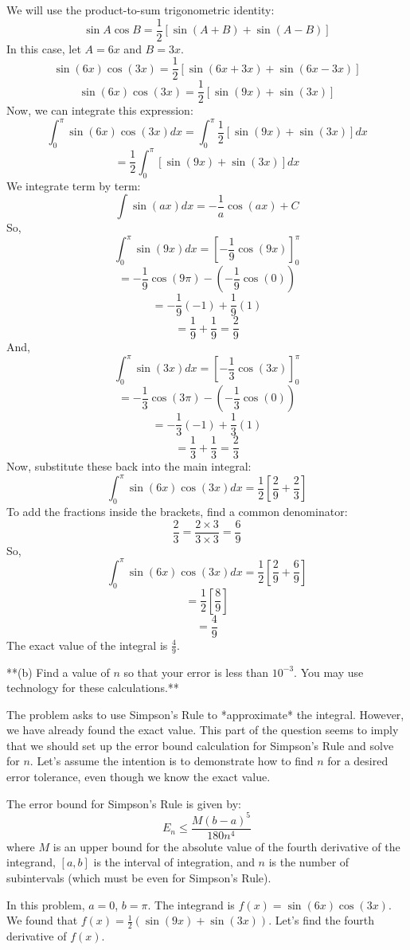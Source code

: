 \documentclass{article}
\begin{document}
We will use the product-to-sum trigonometric identity:
$$ \sin A \cos B = \frac{1}{2} [\sin(A+B) + \sin(A-B)] $$
In this case, let $A = 6x$ and $B = 3x$.
$$ \sin(6x) \cos(3x) = \frac{1}{2} [\sin(6x+3x) + \sin(6x-3x)] $$
$$ \sin(6x) \cos(3x) = \frac{1}{2} [\sin(9x) + \sin(3x)] $$
Now, we can integrate this expression:
$$ \int_0^\pi \sin(6x) \cos(3x) dx = \int_0^\pi \frac{1}{2} [\sin(9x) + \sin(3x)] dx $$
$$ = \frac{1}{2} \int_0^\pi [\sin(9x) + \sin(3x)] dx $$
We integrate term by term:
$$ \int \sin(ax) dx = -\frac{1}{a} \cos(ax) + C $$
So,
$$ \int_0^\pi \sin(9x) dx = \left[-\frac{1}{9} \cos(9x)\right]_0^\pi $$
$$ = -\frac{1}{9} \cos(9\pi) - \left(-\frac{1}{9} \cos(0)\right) $$
$$ = -\frac{1}{9} (-1) + \frac{1}{9} (1) $$
$$ = \frac{1}{9} + \frac{1}{9} = \frac{2}{9} $$
And,
$$ \int_0^\pi \sin(3x) dx = \left[-\frac{1}{3} \cos(3x)\right]_0^\pi $$
$$ = -\frac{1}{3} \cos(3\pi) - \left(-\frac{1}{3} \cos(0)\right) $$
$$ = -\frac{1}{3} (-1) + \frac{1}{3} (1) $$
$$ = \frac{1}{3} + \frac{1}{3} = \frac{2}{3} $$
Now, substitute these back into the main integral:
$$ \int_0^\pi \sin(6x) \cos(3x) dx = \frac{1}{2} \left[\frac{2}{9} + \frac{2}{3}\right] $$
To add the fractions inside the brackets, find a common denominator:
$$ \frac{2}{3} = \frac{2 \times 3}{3 \times 3} = \frac{6}{9} $$
So,
$$ \int_0^\pi \sin(6x) \cos(3x) dx = \frac{1}{2} \left[\frac{2}{9} + \frac{6}{9}\right] $$
$$ = \frac{1}{2} \left[\frac{8}{9}\right] $$
$$ = \frac{4}{9} $$
The exact value of the integral is $\frac{4}{9}$.

**(b) Find a value of $n$ so that your error is less than $10^{-3}$. You may use technology for these calculations.**

The problem asks to use Simpson's Rule to *approximate* the integral. However, we have already found the exact value. This part of the question seems to imply that we should set up the error bound calculation for Simpson's Rule and solve for $n$. Let's assume the intention is to demonstrate how to find $n$ for a desired error tolerance, even though we know the exact value.

The error bound for Simpson's Rule is given by:
$$ E_n \leq \frac{M(b-a)^5}{180n^4} $$
where $M$ is an upper bound for the absolute value of the fourth derivative of the integrand, $[a, b]$ is the interval of integration, and $n$ is the number of subintervals (which must be even for Simpson's Rule).

In this problem, $a = 0$, $b = \pi$. The integrand is $f(x) = \sin(6x)\cos(3x)$.
We found that $f(x) = \frac{1}{2}(\sin(9x) + \sin(3x))$.
Let's find the fourth derivative of $f(x)$.
\end{document}
